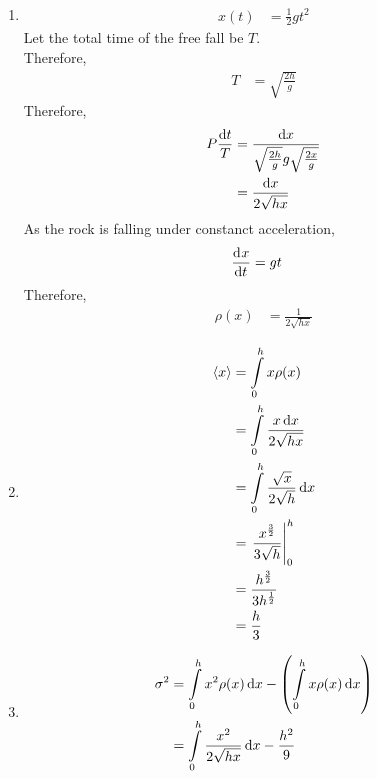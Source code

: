 \documentclass[fleqn, a4paper, 11pt, oneside]{amsart}
\theoremstyle{definition}
\theoremstyle{theorem}
\begin{document}
\begin{solution}
	\begin{enumerate}[leftmargin=*]
		\item
			\begin{align*}
				x(t) & = \frac{1}{2} g t^2
			\end{align*}
			Let the total time of the free fall be $T$.\\
			Therefore,
			\begin{align*}
				T & = \sqrt{\frac{2 h}{g}}
			\end{align*}
			Therefore,
			\begin{align*}
				P \frac{\dif t}{T} & = \frac{\dif x}{\sqrt{\frac{2 h}{g}} g \sqrt{\frac{2 x}{g}}} \\
                                                   & = \frac{\dif x}{2 \sqrt{h x}}
			\end{align*}
			As the rock is falling under constanct acceleration,
			\begin{align*}
				\dod{x}{t} & = g t
			\end{align*}
			Therefore,
			\begin{align*}
				\rho(x) & = \frac{1}{2 \sqrt{h x}}
			\end{align*}
		\item
			\begin{align*}
				\langle x \rangle & = \int\limits_{0}^{h} x \rho(x)                             \\
                                                  & = \int\limits_{0}^{h} \frac{x \dif x}{2 \sqrt{h x}}         \\
                                                  & = \int\limits_{0}^{h} \frac{\sqrt{x}}{2 \sqrt{h}} \dif x    \\
                                                  & = \left. \frac{x^{\frac{3}{2}}}{3 \sqrt{h}} \right|_{0}^{h} \\
                                                  & = \frac{h^{\frac{3}{2}}}{3 h^{\frac{1}{2}}}                 \\
                                                  & = \frac{h}{3}
			\end{align*}
		\item
			\begin{align*}
				\sigma^2          & = \int\limits_{0}^{h} x^2 \rho(x) \dif x - \left( \int\limits_{0}^{h} x \rho(x) \dif x \right)           \\
                                                  & = \int\limits_{0}^{h} \frac{x^2}{2 \sqrt{h x}} \dif x - \frac{h^2}{9}                                    \\

\end{align*}
\end{enumerate}
\end{solution}
\end{document}
